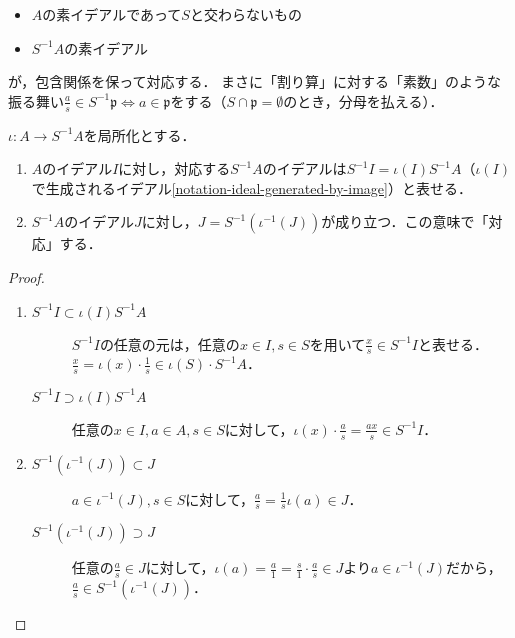 \documentclass[uplatex,dvipdfmx]{jsreport}
\renewcommand{\p}{\mathfrak{p}}
\begin{document}
\begin{tcolorbox}[colframe=ForestGreen, colback=ForestGreen!10!white,breakable,colbacktitle=ForestGreen!40!white,coltitle=black,fonttitle=\bfseries\sffamily,
title=]
    \begin{itemize}
        \item $A$の素イデアルであって$S$と交わらないもの
        \item $S^{-1}A$の素イデアル
    \end{itemize}
    が，包含関係を保って対応する．
    まさに「割り算」に対する「素数」のような振る舞い$\frac{a}{s}\in S^{-1}\p\Leftrightarrow a\in\p$をする（$S\cap\p=\emptyset$のとき，分母を払える）．
\end{tcolorbox}

\begin{lemma}[イデアルの表現]\label{lemma-expression-of-ideal-of-localization}
    $\iota:A\to S^{-1}A$を局所化とする．
    \begin{enumerate}
        \item $A$のイデアル$I$に対し，対応する$S^{-1}A$のイデアルは$S^{-1}I=\iota(I)S^{-1}A$（$\iota(I)$で生成されるイデアル\ref{notation-ideal-generated-by-image}）と表せる．
        \item $S^{-1}A$のイデアル$J$に対し，$J=S^{-1}(\iota^{-1}(J))$が成り立つ．この意味で「対応」する．
    \end{enumerate}
\end{lemma}
\begin{proof}\mbox{}
    \begin{enumerate}
        \item \begin{description}
            \item[$S^{-1}I\subset\iota(I)S^{-1}A$] $S^{-1}I$の任意の元は，任意の$x\in I,s\in S$を用いて$\frac{x}{s}\in S^{-1}I$と表せる．$\frac{x}{s}=\iota(x)\cdot\frac{1}{s}\in\iota(S)\cdot S^{-1}A$．
            \item[$S^{-1}I\supset\iota(I)S^{-1}A$] 任意の$x\in I,a\in A,s\in S$に対して，$\iota(x)\cdot\frac{a}{s}=\frac{ax}{s}\in S^{-1}I$．
        \end{description}
        \item \begin{description}
            \item[$S^{-1}(\iota^{-1}(J))\subset J$] $a\in\iota^{-1}(J),s\in S$に対して，$\frac{a}{s}=\frac{1}{s}\iota(a)\in J$．
            \item[$S^{-1}(\iota^{-1}(J))\supset J$] 任意の$\frac{a}{s}\in J$に対して，$\iota(a)=\frac{a}{1}=\frac{s}{1}\cdot\frac{a}{s}\in J$より$a\in\iota^{-1}(J)$だから，$\frac{a}{s}\in S^{-1}(\iota^{-1}(J))$．
        \end{description}
    \end{enumerate}
\end{proof}
\end{document}
